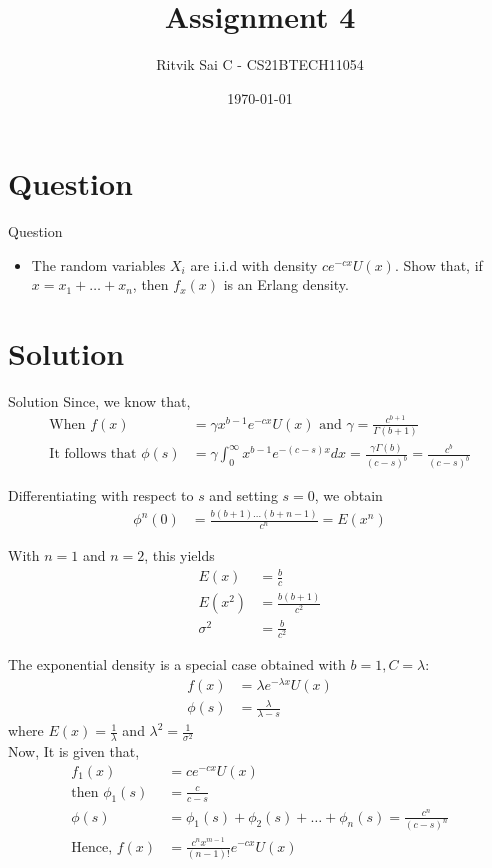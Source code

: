 \documentclass{beamer}
\title{Assignment 4}
\author{Ritvik Sai C - CS21BTECH11054}
\date{\today}
\providecommand{\brak}[1]{\ensuremath{\left(#1\right)}}
\begin{document}
\begin{frame}
    \titlepage 
\end{frame}

\section{Question}
\begin{frame}{Question}
\begin{itemize}
    \item The random variables $X_i$ are i.i.d with density $ce^{-cx} U(x)$. Show that, if $x = x_1+\dots+x_n$, then $f_x(x)$ is an Erlang density.  
\end{itemize}
\end{frame}

\section{Solution}
\begin{frame}[allowframebreaks]{Solution}
 Since, we know that,
\begin{align}
 \text{When } f(x) &= \gamma x^{b-1} e^{-cx} U(x) \text{ and } \gamma = \frac{c^{b+1}}{\Gamma (b+1)} \\
\text{It follows that } \phi (s) &= \gamma \int_{0}^{\infty} x^{b-1} e^{-(c-s)x} dx = \frac{\gamma \Gamma (b)}{\brak{c-s}^b} = \frac{c^b}{\brak{c-s}^b} 
\end{align}

Differentiating with respect to $s$ and setting $s = 0$, we obtain
\begin{align}
    \phi^{n} (0) &= \frac{b(b+1)\dots(b+n-1)}{c^n} = E\brak{x^n}
\end{align}
    
With $n = 1$ and $n = 2$, this yields 
    \begin{align}
        E\brak{x} &= \frac{b}{c} \\
        E \brak{x^2} &= \frac{b(b+1)}{c^2}\\
        \sigma^2 &= \frac{b}{c^2}
    \end{align}
    
    The exponential density is a special case obtained with $b = 1, C = \lambda$: 
    \begin{align}
        f(x) &= \lambda e^{-\lambda x} U(x) \\
        \phi (s) &= \frac{\lambda}{\lambda - s} 
    \end{align}
    where $E\brak{x} = \frac{1}{\lambda}$ and  $\lambda^2 = \frac{1}{\sigma^2}$ \\ 
Now, It is given that, 
\begin{align}
f_1(x) &= ce^{-cx} U(x) \\
\text{then } \phi_1(s) &= \frac{c}{c-s}\\
\phi(s) &= \phi_1(s) + \phi_2(s) + \dots + \phi_n(s) = \frac{c^n}{\brak{c-s}^n}\\
   \text{Hence, } f(x) &= \frac{c^n x^{m-1}}{\brak{n-1}!} e^{-cx} U(x)  
    \end{align}
\end{frame} 
\end{document}
